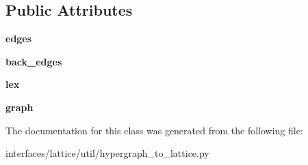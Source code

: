 \subsection*{Public Attributes}
\begin{DoxyCompactItemize}
\item 
\hypertarget{classhypergraph__to__lattice_1_1LatNode_a46e15397405f9e3ce3d1e73605f0285a}{
{\bfseries edges}}
\label{classhypergraph__to__lattice_1_1LatNode_a46e15397405f9e3ce3d1e73605f0285a}

\item 
\hypertarget{classhypergraph__to__lattice_1_1LatNode_a9c9f4406aa0ac3185f04c9859378e45a}{
{\bfseries back\_\-edges}}
\label{classhypergraph__to__lattice_1_1LatNode_a9c9f4406aa0ac3185f04c9859378e45a}

\item 
\hypertarget{classhypergraph__to__lattice_1_1LatNode_a7f57c9d4ecaedad8ce3b15dd4584221a}{
{\bfseries lex}}
\label{classhypergraph__to__lattice_1_1LatNode_a7f57c9d4ecaedad8ce3b15dd4584221a}

\item 
\hypertarget{classhypergraph__to__lattice_1_1LatNode_a59dada46e36c28a9b68d30a88fc542ac}{
{\bfseries graph}}
\label{classhypergraph__to__lattice_1_1LatNode_a59dada46e36c28a9b68d30a88fc542ac}

\end{DoxyCompactItemize}


The documentation for this class was generated from the following file:\begin{DoxyCompactItemize}
\item 
interfaces/lattice/util/hypergraph\_\-to\_\-lattice.py\end{DoxyCompactItemize}
